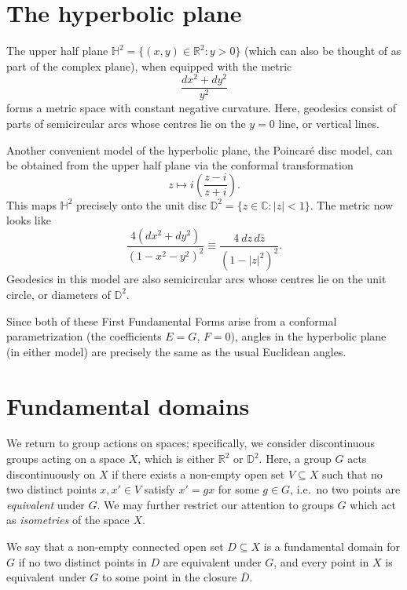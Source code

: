 \documentclass[12pt]{article}
\newcommand{\R}{\mathbb{R}}
\newcommand{\C}{\mathbb{C}}
\theoremstyle{definition}
\theoremstyle{remark}
\begin{document}
    \section{The hyperbolic plane}

    The upper half plane $\mathbb{H}^2 = \{(x, y) \in \R^2\colon y > 0\}$ (which can
    also be thought of as part of the complex plane), when equipped with the metric
    \[
        \frac{dx^2 + dy^2}{y^2}
    \] forms a metric space with constant negative curvature. Here, geodesics consist
    of parts of semicircular arcs whose centres lie on the $y = 0$ line, or vertical
    lines.

    Another convenient model of the hyperbolic plane, the Poincar\'e disc model, can
    be obtained from the upper half plane via the conformal transformation \[
        z \mapsto i\left(\frac{z - i}{z + i}\right).
    \] This maps $\mathbb{H}^2$ precisely onto the unit disc $\mathbb{D}^2 = \{z \in
    \C \colon |z| < 1\}$. The metric now looks like \[
        \frac{4(dx^2 + dy^2)}{(1 - x^2 - y^2)^2} \equiv
        \frac{4\:dz\,d\bar{z}}{(1 - |z|^2)^2}.
    \] Geodesics in this model are also semicircular arcs whose centres lie on the
    unit circle, or diameters of $\mathbb{D}^2$.

    Since both of these First Fundamental Forms arise from a conformal
    parametrization (the coefficients $E = G$, $F = 0$), angles in the hyperbolic
    plane (in either model) are precisely the same as the usual Euclidean angles.


    \section{Fundamental domains}

    We return to group actions on spaces; specifically, we consider discontinuous
    groups acting on a space $X$, which is either $\R^2$ or $\mathbb{D}^2$. Here, a
    group $G$ acts discontinuously on $X$ if there exists a non-empty open set
    $V\subseteq X$ such that no two distinct points $x, x' \in V$ satisfy $x' = gx$
    for some $g \in G$, i.e.\ no two points are \emph{equivalent} under $G$. We may
    further restrict our attention to groups $G$ which act as \emph{isometries} of
    the space $X$.

    We say that a non-empty connected open set $D \subseteq X$ is a fundamental
    domain for $G$ if no two distinct points in $D$ are equivalent under $G$, and
    every point in $X$ is equivalent under $G$ to some point in the closure
    $\overline{D}$.
\end{document}
